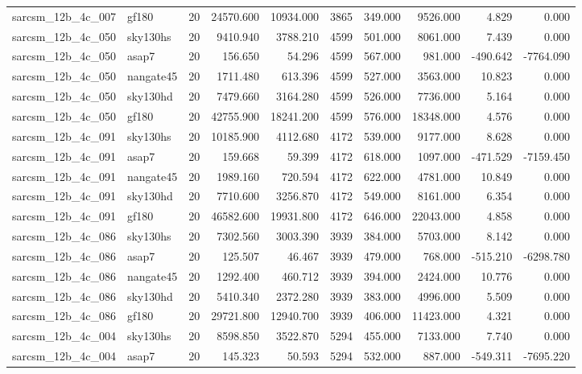 \begin{tabular}{llrrrrrrrr}
sarcsm\_12b\_4c\_007 & gf180 & 20 & 24570.600 & 10934.000 & 3865 & 349.000 & 9526.000 & 4.829 & 0.000 \\
sarcsm\_12b\_4c\_050 & sky130hs & 20 & 9410.940 & 3788.210 & 4599 & 501.000 & 8061.000 & 7.439 & 0.000 \\
sarcsm\_12b\_4c\_050 & asap7 & 20 & 156.650 & 54.296 & 4599 & 567.000 & 981.000 & -490.642 & -7764.090 \\
sarcsm\_12b\_4c\_050 & nangate45 & 20 & 1711.480 & 613.396 & 4599 & 527.000 & 3563.000 & 10.823 & 0.000 \\
sarcsm\_12b\_4c\_050 & sky130hd & 20 & 7479.660 & 3164.280 & 4599 & 526.000 & 7736.000 & 5.164 & 0.000 \\
sarcsm\_12b\_4c\_050 & gf180 & 20 & 42755.900 & 18241.200 & 4599 & 576.000 & 18348.000 & 4.576 & 0.000 \\
sarcsm\_12b\_4c\_091 & sky130hs & 20 & 10185.900 & 4112.680 & 4172 & 539.000 & 9177.000 & 8.628 & 0.000 \\
sarcsm\_12b\_4c\_091 & asap7 & 20 & 159.668 & 59.399 & 4172 & 618.000 & 1097.000 & -471.529 & -7159.450 \\
sarcsm\_12b\_4c\_091 & nangate45 & 20 & 1989.160 & 720.594 & 4172 & 622.000 & 4781.000 & 10.849 & 0.000 \\
sarcsm\_12b\_4c\_091 & sky130hd & 20 & 7710.600 & 3256.870 & 4172 & 549.000 & 8161.000 & 6.354 & 0.000 \\
sarcsm\_12b\_4c\_091 & gf180 & 20 & 46582.600 & 19931.800 & 4172 & 646.000 & 22043.000 & 4.858 & 0.000 \\
sarcsm\_12b\_4c\_086 & sky130hs & 20 & 7302.560 & 3003.390 & 3939 & 384.000 & 5703.000 & 8.142 & 0.000 \\
sarcsm\_12b\_4c\_086 & asap7 & 20 & 125.507 & 46.467 & 3939 & 479.000 & 768.000 & -515.210 & -6298.780 \\
sarcsm\_12b\_4c\_086 & nangate45 & 20 & 1292.400 & 460.712 & 3939 & 394.000 & 2424.000 & 10.776 & 0.000 \\
sarcsm\_12b\_4c\_086 & sky130hd & 20 & 5410.340 & 2372.280 & 3939 & 383.000 & 4996.000 & 5.509 & 0.000 \\
sarcsm\_12b\_4c\_086 & gf180 & 20 & 29721.800 & 12940.700 & 3939 & 406.000 & 11423.000 & 4.321 & 0.000 \\
sarcsm\_12b\_4c\_004 & sky130hs & 20 & 8598.850 & 3522.870 & 5294 & 455.000 & 7133.000 & 7.740 & 0.000 \\
sarcsm\_12b\_4c\_004 & asap7 & 20 & 145.323 & 50.593 & 5294 & 532.000 & 887.000 & -549.311 & -7695.220 \\

\end{tabular}
